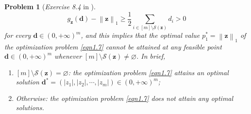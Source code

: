 \documentclass[11pt]{article}
\newtheorem{problem}{Problem}
\numberwithin{equation}{problem}
\begin{document}
\begin{problem} [\emph{Exercise 8.4} in \cite{calafiore2014optimization}]
{\begin{equation*}
    g_{\mathbf{z}}(\mathbf{d}) - \left\| \mathbf{z} \right\|_1 \geq
    \frac{1}{2} \sum_{i \in [m] \setminus \mathcal{S}(\mathbf{z})} d_i > 0
\end{equation*}
for every $\mathbf{d} \in \left( 0, +\infty \right)^m$, and this implies that the optimal value $p_{1}^* = \left\| \mathbf{z} \right\|_1$ of the optimization problem \eqref{eqn1.7} cannot be attained at any feasible point $\mathbf{d} \in \left( 0, +\infty \right)^m$ whenever $[m] \setminus \mathcal{S}(\mathbf{z}) \neq \varnothing$. In brief,
\begin{enumerate} [label=(\roman*)]
    \item $[m] \setminus \mathcal{S}(\mathbf{z}) = \varnothing$: the optimization problem \eqref{eqn1.7} attains an optimal solution $\mathbf{d}^* = \left( \left| z_1 \right|, \left| z_2 \right|, \cdots, \left| z_m \right| \right) \in \left( 0, +\infty \right)^m$;
    \item Otherwise: the optimization problem \eqref{eqn1.7} does not attain any optimal solutions.
\end{enumerate}

}
\end{problem}
\end{document}
